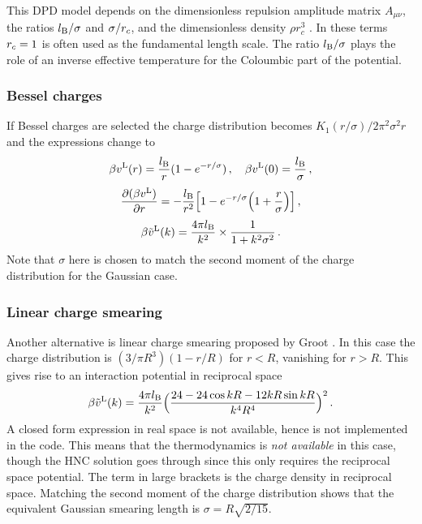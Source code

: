 \documentclass[12pt,a4paper]{article}
\newcommand{\lr}{^{\mathrm{L}}}
\begin{document}
This DPD model depends on the dimensionless repulsion amplitude matrix
$A_{\mu\nu}$, the ratios $l_{\mathrm{B}}/\sigma$ and $\sigma/r_c$, and the
dimensionless density $\rho r_c^3$ \cite{WVA+13}.  In these terms
$r_c=1$ is often used as the fundamental length scale.  The ratio
$l_{\mathrm{B}}/\sigma$ plays the role of an inverse effective temperature for
the Coloumbic part of the potential.

\subsubsection{Bessel charges}
%
If Bessel charges are selected the charge distribution becomes
$K_1(r/\sigma) / 2\pi^2\sigma^2 r$ and the expressions change to
\cite{WV14}
%
\begin{equation}
  \beta v\lr(r)=\frac{\lB}{r}(1-e^{-r/\sigma})\,,\quad
  \beta v\lr(0)=\frac{\lB}{\sigma}\,,
\end{equation}
%
\begin{equation}
\frac{\partial(\beta v\lr)}{\partial r}=
-\frac{\lB}{r^2}\Bigl[1-e^{-r/\sigma}\Bigl(1+\frac{r}{\sigma}\Bigr)\Bigr]\,,
\end{equation}
%
\begin{equation}
\beta {\tilde v}\lr(k)=\frac{4\pi\lB}{k^2}\times\frac{1}{1+k^2\sigma^2}\,.
\end{equation}
%
Note that $\sigma$ here is chosen to match the second moment of the
charge distribution for the Gaussian case.

\subsubsection{Linear charge smearing}
%
Another alternative is linear charge smearing proposed by Groot
\cite{Groot03}.  In this case the charge distribution is $(3/\pi
R^3)(1-r/R)$ for $r<R$, vanishing for $r>R$. This gives rise to an
interaction potential in reciprocal space \cite{WV14}
%
\begin{equation}
\beta {\tilde v}\lr(k)=\frac{4\pi\lB}{k^2}
\Bigl(\frac{24-24\cos kR-12kR\sin kR}{k^4R^4}\Bigr)^2\,.
\end{equation}
%
A closed form expression in real space is not available, hence is not
implemented in the code.  This means that the thermodynamics is
\emph{not available} in this case, though the HNC solution goes
through since this only requires the reciprocal space potential.  The
term in large brackets is the charge density in reciprocal space.
Matching the second moment of the charge distribution \cite{WV14}
shows that the equivalent Gaussian smearing length is
$\sigma=R\sqrt{2/15}$.
\end{document}
